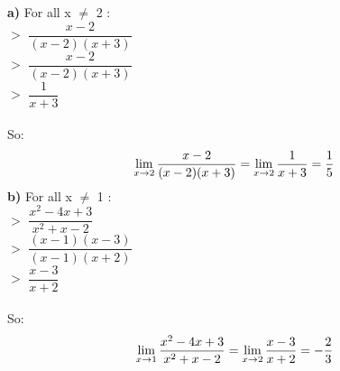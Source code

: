 \documentclass{article}
\begin{document}
  \textbf{a)} For all x $\neq$ 2 : \\ 
  $>$ $\dfrac{x-2}{(x-2)(x+3)}$ \\
  $>$ $\dfrac{x-2}{(x-2)(x+3)}$ \\
  $>$ $\dfrac{1}{x+3}$ \\ \\
  So: 
  $$\lim_{x\to2} \dfrac{x-2}{(x-2)(x+3)} = \lim_{x\to2} \\ \\ \dfrac{1}{x+3} = \dfrac{1}{5}$$
  \textbf{b)} For all x $\neq$ 1 : \\
  $>$ $\dfrac{x^2 -4x + 3}{x^2 + x - 2}$ \\
  $>$ $\dfrac{(x-1)(x-3)}{(x-1)(x+2)}$ \\
  $>$ $\dfrac{x-3}{x+2}$ \\ \\
  So:
  $$\lim_{x\to1} \dfrac{x^2 -4x + 3}{x^2 + x - 2} = \lim_{x\to2} \\ \\ \dfrac{x-3}{x+2} = -\dfrac{2}{3}$$
  
  
\end{document}
